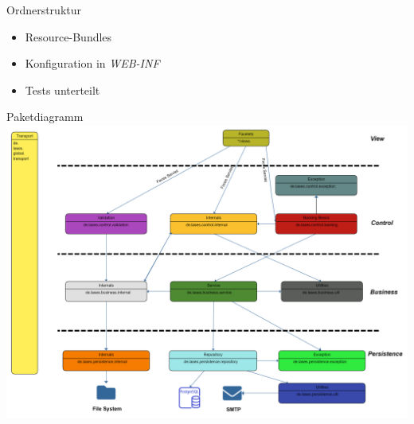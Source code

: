 \documentclass{beamer}
\begin{document}
\begin{frame}{Ordnerstruktur}
        \begin{itemize}
            \item Resource-Bundles
            \pause
            \item Konfiguration in \emph{WEB-INF}
            \pause
            \item Tests unterteilt
        \end{itemize}
    \end{frame}


    \begin{frame}{Paketdiagramm}
        \centering
        \includegraphics[height=0.7\textheight]{graphics/Paketdiagramm (15)}
    \end{frame}
\end{document}
